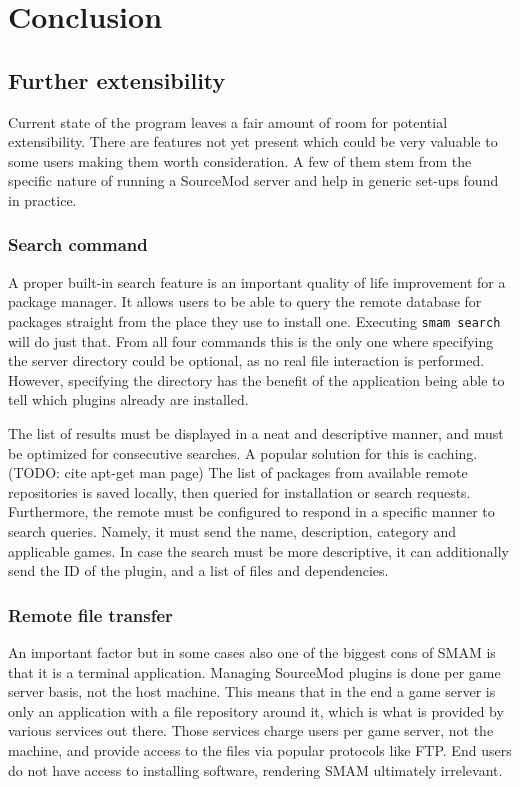 \chapter{Conclusion}

\section{Further extensibility}

Current state of the program leaves a fair amount of room for potential extensibility.
There are features not yet present which could be very valuable to some users making them worth consideration.
A few of them stem from the specific nature of running a SourceMod server and help in generic set-ups found in practice.

\subsection{Search command}

A proper built-in search feature is an important quality of life improvement for a package manager.
It allows users to be able to query the remote database for packages straight from the place they use to install one.
Executing \verb|smam search| will do just that.
From all four commands this is the only one where specifying the server directory could be optional, as no real file interaction is performed.
However, specifying the directory has the benefit of the application being able to tell which plugins already are installed.

The list of results must be displayed in a neat and descriptive manner, and must be optimized for consecutive searches.
A popular solution for this is caching. (TODO: cite apt-get man page)
The list of packages from available remote repositories is saved locally, then queried for installation or search requests.
Furthermore, the remote must be configured to respond in a specific manner to search queries.
Namely, it must send the name, description, category and applicable games.
In case the search must be more descriptive, it can additionally send the ID of the plugin, and a list of files and dependencies.

\subsection{Remote file transfer}

An important factor but in some cases also one of the biggest cons of SMAM is that it is a terminal application.
Managing SourceMod plugins is done per game server basis, not the host machine.
This means that in the end a game server is only an application with a file repository around it, which is what is provided by various services out there.
Those services charge users per game server, not the machine, and provide access to the files via popular protocols like FTP\@.
End users do not have access to installing software, rendering SMAM ultimately irrelevant.

